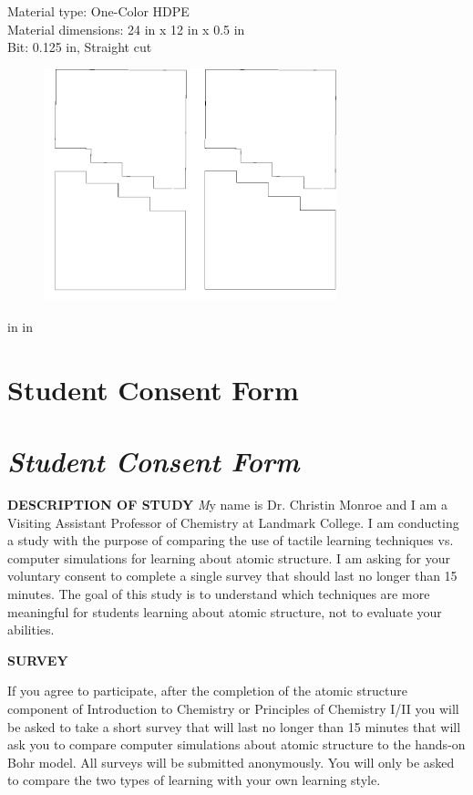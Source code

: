\documentclass[11pt]{sig-alternate}
\begin{document}
\begin{large}
\begin{figure}[htp]
    \label{Image show a blue print with sizing/dimensions of the fabricated Bohr model.}
\end{figure}
Material type: One-Color HDPE\\
Material dimensions: 24 in x 12 in x 0.5 in\\
Bit: 0.125 in, Straight cut\\
\begin{figure}[htp]
    \centering
    \includegraphics[width=8.5cm]{CNC-Patterns3.png}
    \label{Image show a blueprint with sizing/dimensions of the fabricated Bohr model.}
\end{figure}
\clearpage
\onecolumn
{} in
 in 

\section*{Student Consent Form}\par 
\section*{\textit{Student Consent Form}}

\textbf{DESCRIPTION OF STUDY}
\textit 
My name is Dr. Christin Monroe and I am a Visiting Assistant Professor of Chemistry at Landmark College.  I am conducting a study with the purpose of comparing the use of tactile learning techniques vs. computer simulations for learning about atomic structure.  I am asking for your voluntary consent to complete a single survey that should last no longer than 15 minutes.  The goal of this study is to understand which techniques are more meaningful for students learning about atomic structure, not to evaluate your abilities.

\textbf{SURVEY}

If you agree to participate, after the completion of the atomic structure component of Introduction to Chemistry or Principles of Chemistry I/II you will be asked to take a short survey that will last no longer than 15 minutes that will ask you to compare computer simulations about atomic structure to the hands-on Bohr model.  All surveys will be submitted anonymously.  You will only be asked to compare the two types of learning with your own learning style.


\end{large}
\end{document}
